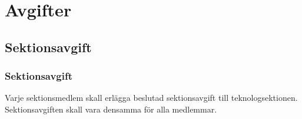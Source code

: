 \section{Avgifter}

\subsection{Sektionsavgift}

\subsubsection{Sektionsavgift}
Varje sektionsmedlem skall erlägga beslutad sektionsavgift till teknologsektionen. Sektionsavgiften skall vara densamma för alla medlemmar.
